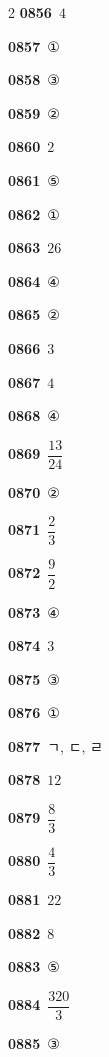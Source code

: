 \documentclass[10pt,a4paper]{article}
\begin{document}
\begin{multicols}{2}
\noindent\textbf{0856}\ $4$\par
\noindent\textbf{0857}\ ①\par
\noindent\textbf{0858}\ ③\par
\noindent\textbf{0859}\ ②\par
\noindent\textbf{0860}\ $2$\par
\noindent\textbf{0861}\ ⑤\par
\noindent\textbf{0862}\ ①\par
\noindent\textbf{0863}\ $26$\par
\noindent\textbf{0864}\ ④\par
\noindent\textbf{0865}\ ②\par
\noindent\textbf{0866}\ $3$\par
\noindent\textbf{0867}\ $4$\par
\noindent\textbf{0868}\ ④\par
\noindent\textbf{0869}\ $\dfrac{13}{24}$\par
\noindent\textbf{0870}\ ②\par
\noindent\textbf{0871}\ $\dfrac{2}{3}$\par
\noindent\textbf{0872}\ $\dfrac{9}{2}$\par
\noindent\textbf{0873}\ ④\par
\noindent\textbf{0874}\ $3$\par
\noindent\textbf{0875}\ ③\par
\noindent\textbf{0876}\ ①\par
\noindent\textbf{0877}\ ㄱ, ㄷ, ㄹ\par
\noindent\textbf{0878}\ $12$\par
\noindent\textbf{0879}\ $\dfrac{8}{3}$\par
\noindent\textbf{0880}\ $\dfrac{4}{3}$\par
\noindent\textbf{0881}\ $22$\par
\noindent\textbf{0882}\ $8$\par
\noindent\textbf{0883}\ ⑤\par
\noindent\textbf{0884}\ $\dfrac{320}{3}$\par
\noindent\textbf{0885}\ ③\par
\end{multicols}
\end{document}
